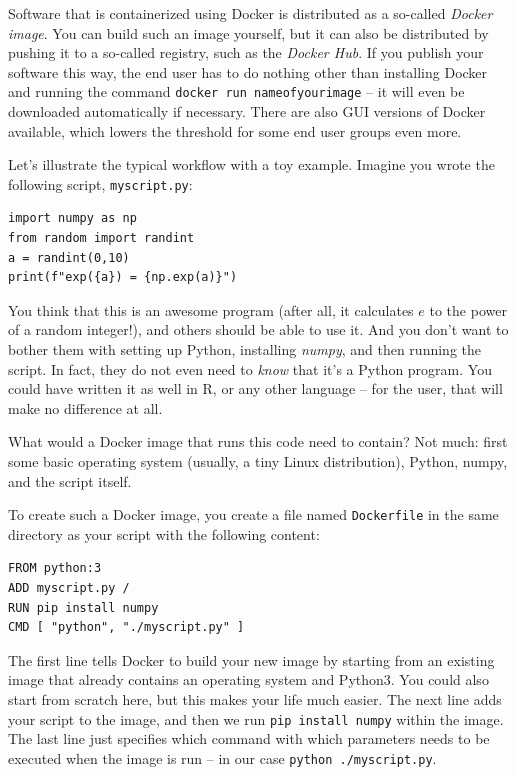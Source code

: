 Software that is containerized using Docker is distributed as a
so-called \emph{Docker image}. You can build such an image yourself,
but it can also be distributed by pushing it to a so-called registry,
such as the \emph{Docker Hub}. If you publish your software this
way, the end user has to do nothing other than installing Docker and
running the command \verb|docker run nameofyourimage| -- it will even be
downloaded automatically if necessary. There are also GUI versions
of Docker available, which lowers the threshold for some end user
groups even more.

Let's illustrate the typical workflow with a toy example. Imagine
you wrote the following script, \verb|myscript.py|:

\begin{verbatim}
import numpy as np
from random import randint
a = randint(0,10)
print(f"exp({a}) = {np.exp(a)}")
\end{verbatim}

You think that this is an awesome program (after all, it calculates
$e$ to the power of a random integer!), and others should be able
to use it. And you don't want to bother them with setting up Python,
installing \emph{numpy}, and then running the script. In fact, they do
not even need to \emph{know} that it's a Python program. You
could have written it as well in R, or any other language -- for
the user, that will make no difference at all.

What would a Docker image that runs this code need to contain? Not
much: first some basic operating system (usually, a tiny Linux distribution),
Python, numpy, and the script itself.

To create such a Docker image, you create a file named \verb|Dockerfile|
in the same directory as your script with the following content:

\begin{verbatim}
FROM python:3
ADD myscript.py /
RUN pip install numpy
CMD [ "python", "./myscript.py" ]
\end{verbatim}


The first line tells Docker to build your new image by starting
from an existing image that already contains an operating system
and Python3. You could also start from scratch here, but this
makes your life much easier. The next line adds your script to the
image, and then we run \verb|pip install numpy| within the image.
The last line just specifies which command with which parameters
needs to be executed when the image is run -- in our case
\verb|python ./myscript.py|.

